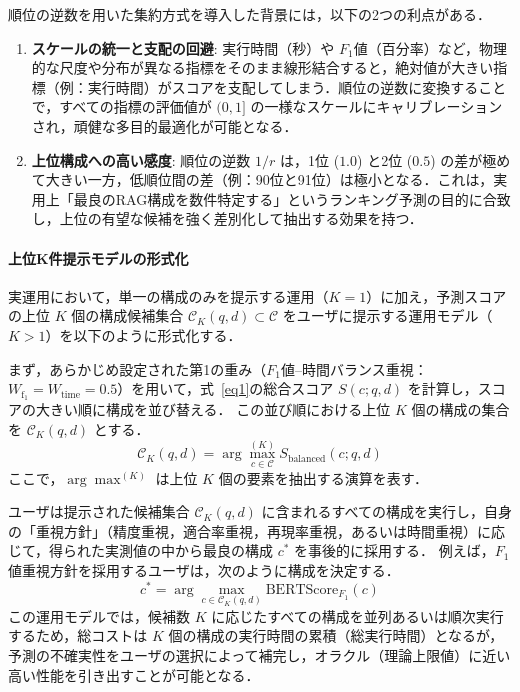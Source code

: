 順位の逆数を用いた集約方式を導入した背景には，以下の2つの利点がある．
\begin{enumerate}
\item \textbf{スケールの統一と支配の回避}: 実行時間（秒）や $F_1$値（百分率）など，物理的な尺度や分布が異なる指標をそのまま線形結合すると，絶対値が大きい指標（例：実行時間）がスコアを支配してしまう．順位の逆数に変換することで，すべての指標の評価値が $(0, 1]$ の一様なスケールにキャリブレーションされ，頑健な多目的最適化が可能となる．
\item \textbf{上位構成への高い感度}: 順位の逆数 $1/r$ は，1位 ($1.0$) と2位 ($0.5$) の差が極めて大きい一方，低順位間の差（例：90位と91位）は極小となる．これは，実用上「最良のRAG構成を数件特定する」というランキング予測の目的に合致し，上位の有望な候補を強く差別化して抽出する効果を持つ．
\end{enumerate}

\paragraph{上位K件提示モデルの形式化}
実運用において，単一の構成のみを提示する運用（$K=1$）に加え，予測スコアの上位 $K$ 個の構成候補集合 $\mathcal{C}_K(q, d) \subset \mathcal{C}$ をユーザに提示する運用モデル（$K > 1$）を以下のように形式化する．

まず，あらかじめ設定された第1の重み（$F_1$値--時間バランス重視：$W_{\mathrm{f_1}} = W_{\mathrm{time}} = 0.5$）を用いて，式~\eqref{eq1}の総合スコア $S(c; q, d)$ を計算し，スコアの大きい順に構成を並び替える．
この並び順における上位 $K$ 個の構成の集合を $\mathcal{C}_K(q, d)$ とする．
\begin{equation}
\mathcal{C}_K(q, d) = \arg\max^{(K)}_{c \in \mathcal{C}} S_{\mathrm{balanced}}(c; q, d)
\label{eq3}
\end{equation}
ここで，$\arg\max^{(K)}$ は上位 $K$ 個の要素を抽出する演算を表す．

ユーザは提示された候補集合 $\mathcal{C}_K(q, d)$ に含まれるすべての構成を実行し，自身の「重視方針」（精度重視，適合率重視，再現率重視，あるいは時間重視）に応じて，得られた実測値の中から最良の構成 $c^*$ を事後的に採用する．
例えば，$F_1$値重視方針を採用するユーザは，次のように構成を決定する．
\begin{equation}
c^* = \arg\max_{c \in \mathcal{C}_K(q, d)} \text{BERTScore}_{F_1}(c)
\label{eq4}
\end{equation}
この運用モデルでは，候補数 $K$ に応じたすべての構成を並列あるいは順次実行するため，総コストは $K$ 個の構成の実行時間の累積（総実行時間）となるが，予測の不確実性をユーザの選択によって補完し，オラクル（理論上限値）に近い高い性能を引き出すことが可能となる．

